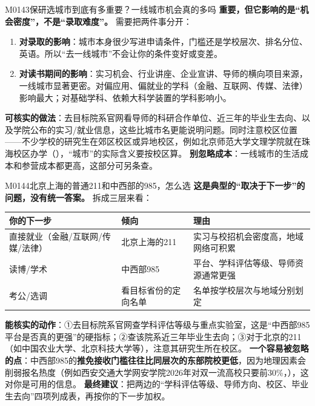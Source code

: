 \begin{qa}{M0143}{保研选城市到底有多重要？一线城市机会真的多吗}
\textbf{重要，但它影响的是“机会密度”，不是“录取难度”。} 需要把两件事分开：
\begin{enumerate}
  \item \textbf{对录取的影响}：城市本身很少写进申请条件，门槛还是学校层次、排名分位、英语。所以“去一线城市”不会让你的条件变好或变差。
  \item \textbf{对读书期间的影响}：实习机会、行业讲座、企业宣讲、导师的横向项目来源，一线城市显著更密。对偏应用、偏就业的学科（金融、互联网、传媒、法律）影响最大；对基础学科、依赖大科学装置的学科影响小。
\end{enumerate}
\textbf{可核实的做法}：去目标院系官网看导师的科研合作单位、近三年的毕业生去向、以及学院公布的实习/就业信息，这些比城市名更能说明问题。同时注意校区位置——不少学校的研究生在郊区校区或异地校区，例如北京师范大学文理学院就在珠海校区办学（），“城市”的实际含义要按校区算。
\textbf{别忽略成本}：一线城市的生活成本和参营成本都更高，这部分可另条查。
\end{qa}

\begin{qa}{M0144}{北京上海的普通211和中西部的985，怎么选}
\textbf{这是典型的“取决于下一步”的问题，没有统一答案。} 拆成三层来看：
\par\vspace{2pt}\nobreak\begin{center}\footnotesize
\begin{tabularx}{\textwidth}{>{\raggedright\arraybackslash}X>{\raggedright\arraybackslash}X>{\raggedright\arraybackslash}X}
\toprule
\textbf{你的下一步} & \textbf{倾向} & \textbf{理由} \\ \midrule
直接就业（金融/互联网/传媒/法律） & 北京上海的211 & 实习与校招机会密度高，地域网络可积累 \\
读博/学术 & 中西部985 & 平台、学科评估等级、导师资源通常更强 \\
考公/选调 & 看目标省份的定向名单 & 名单按学校层次与地域分别划定 \\
\bottomrule
\end{tabularx}
\end{center}\vspace{2pt}\par

\textbf{能核实的动作}：①去目标院系官网查学科评估等级与重点实验室，这是“中西部985平台是否真的更强”的硬指标；②查该院系近三年毕业生去向；③对于北京的211（如中国农业大学、北京科技大学等），注意其研究生所在校区。
\textbf{一个容易被忽略的点}：中西部985的\textbf{推免接收门槛往往比同层次的东部院校更低}，因为地理因素会削弱报名热度（例如西安交通大学网安学院2026年对双一流高校只要前30\%，），这对你是可用的信息。
\textbf{最终建议}：把两边的“学科评估等级、导师方向、校区、毕业生去向”四项列成表，再按你的下一步加权。
\end{qa}

